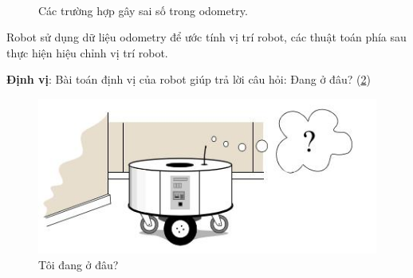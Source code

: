 \begin{figure}
	\centering
	\hspace{8pt}
	\\
	\hspace{8pt}
	\caption[]{Các trường hợp gây sai số trong odometry.}
	\label{fig:wheel}
\end{figure}

Robot sử dụng dữ liệu odometry để ước tính vị trí robot, các thuật toán phía sau thực hiện hiệu chỉnh vị trí robot.

\textbf{Định vị}: Bài toán định vị của robot giúp trả lời câu hỏi: Đang ở đâu? (\figurename{\ref{fig:localization}})
\begin{figure}[tph]
	\centering
	\includegraphics[width=0.7\linewidth]{chapter1/figs/localization}
	\caption{Tôi đang ở đâu?}
	\label{fig:localization}
\end{figure}

